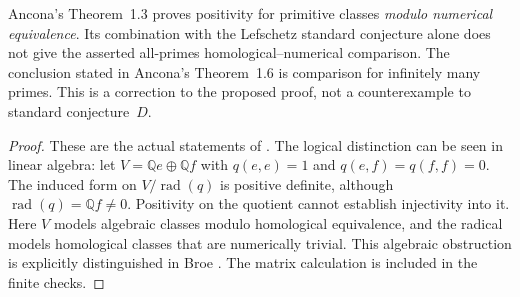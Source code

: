 \begin{proposition}\label{B:ancona-scope}
Ancona's Theorem~1.3 proves positivity for primitive classes \emph{modulo numerical equivalence}. Its combination with the Lefschetz standard conjecture alone does not give the asserted all-primes homological--numerical comparison. The conclusion stated in Ancona's Theorem~1.6 is comparison for infinitely many primes. This is a correction to the proposed proof, not a counterexample to standard conjecture~$D$.
\end{proposition}
\begin{proof}
These are the actual statements of \cite[Theorems 1.3, 1.6; Remark 3.21]{BAncona2021}. The logical distinction can be seen in linear algebra: let $V=\mathbb Qe\oplus\mathbb Qf$ with $q(e,e)=1$ and $q(e,f)=q(f,f)=0$. The induced form on $V/\operatorname{rad}(q)$ is positive definite, although $\operatorname{rad}(q)=\mathbb Qf\ne0$. Positivity on the quotient cannot establish injectivity into it. Here $V$ models algebraic classes modulo homological equivalence, and the radical models homological classes that are numerically trivial. This algebraic obstruction is explicitly distinguished in Broe \cite[Remark 1.3]{BBroe2026}. The matrix calculation is included in the finite checks.
\end{proof}

